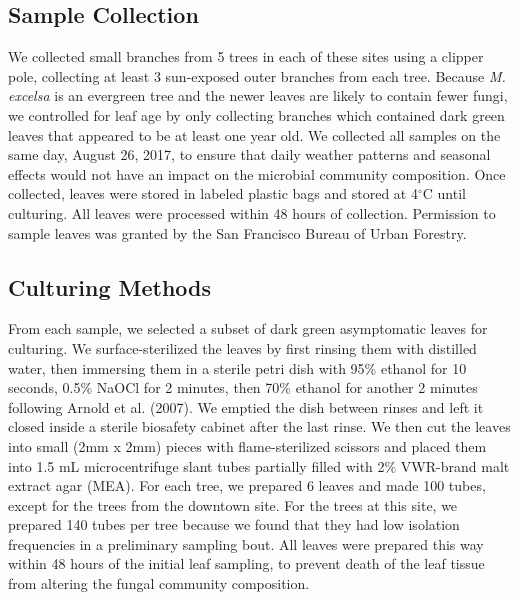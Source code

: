 \documentclass[fleqn,10pt,lineno]{wlpeerj} %
\begin{document}
\hypertarget{sample-collection}{%
\subsection*{Sample Collection}\label{sample-collection}}

We collected small branches from 5 trees in each of these sites using a clipper pole, collecting at least 3 sun-exposed outer branches from each tree. Because \emph{M. excelsa} is an evergreen tree and the newer leaves are likely to contain fewer fungi, we controlled for leaf age by only collecting branches which contained dark green leaves that appeared to be at least one year old. We collected all samples on the same day, August 26, 2017, to ensure that daily weather patterns and seasonal effects would not have an impact on the microbial community composition. Once collected, leaves were stored in labeled plastic bags and stored at 4\(^{\circ}\)C until culturing. All leaves were processed within 48 hours of collection. Permission to sample leaves was granted by the San Francisco Bureau of Urban Forestry.

\hypertarget{culturing-methods}{%
\subsection*{Culturing Methods}\label{culturing-methods}}

From each sample, we selected a subset of dark green asymptomatic leaves for culturing. We surface-sterilized the leaves by first rinsing them with distilled water, then immersing them in a sterile petri dish with 95\% ethanol for 10 seconds, 0.5\% NaOCl for 2 minutes, then 70\% ethanol for another 2 minutes following Arnold et al. (2007). We emptied the dish between rinses and left it closed inside a sterile biosafety cabinet after the last rinse. We then cut the leaves into small (2mm x 2mm) pieces with flame-sterilized scissors and placed them into 1.5 mL microcentrifuge slant tubes partially filled with 2\% VWR-brand malt extract agar (MEA). For each tree, we prepared 6 leaves and made 100 tubes, except for the trees from the downtown site. For the trees at this site, we prepared 140 tubes per tree because we found that they had low isolation frequencies in a preliminary sampling bout. All leaves were prepared this way within 48 hours of the initial leaf sampling, to prevent death of the leaf tissue from altering the fungal community composition.
\end{document}
